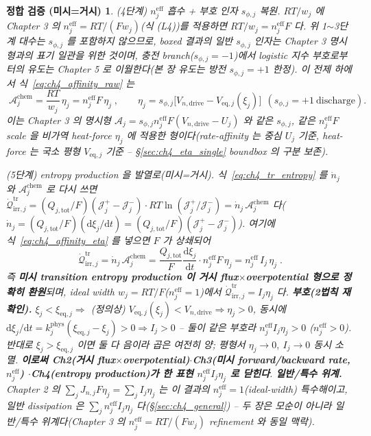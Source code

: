 \documentclass[11pt,a4paper]{article}
\newtheorem*{verifybox}{정합 검증 (미시=거시)}
\newcommand{\dd}{\mathrm{d}}
\newcommand{\eff}{\mathrm{eff}}
\newcommand{\eq}{\mathrm{eq}}
\newcommand{\drive}{\mathrm{drive}}
\newcommand{\tot}{\mathrm{tot}}
\newcommand{\irr}{\mathrm{irr}}
\newcommand{\tr}{\mathrm{tr}}
\newcommand{\chem}{\mathrm{chem}}
\begin{document}
\begin{verifybox}
\emph{(4단계) $n_j^{\eff}$ 흡수 + 부호 인자 $s_{\phi,j}$ 복원.} $RT/w_j$ 에 Chapter 3 의
$n_j^{\eff}=RT/(Fw_j)$(식 (L4))를 적용하면 $RT/w_j=n_j^{\eff}F$ 다. \emph{위 1$\sim$3단계 대수는 $s_{\phi,j}$ 를
포함하지 않으므로}, boxed 결과의 일반 $s_{\phi,j}$ 인자는 Chapter 3 명시형과의 \emph{표기 일관}을 위한 것이며,
충전 branch($s_{\phi,j}=-1$)에서 logistic 지수 부호로부터의 \emph{유도}는 Chapter 5 로 이월한다(본 장 유도는 방전
$s_{\phi,j}=+1$ 한정). 이 전제 하에서 식~\eqref{eq:ch4_affinity_raw} 는
\begin{equation}
\boxed{\;\mathcal A_j^{\chem}=\frac{RT}{w_j}\,\eta_j=n_j^{\eff}F\,\eta_j\;,\qquad
\eta_j=s_{\phi,j}\big[V_{n,\drive}-V_{\eq,j}(\xi_j)\big]\ \ (s_{\phi,j}=+1\ \text{discharge}).}
\label{eq:ch4_affinity_eta}
\end{equation}
이는 Chapter 3 의 명시형 $\mathcal A_j=s_{\phi,j}n_j^{\eff}F(V_{n,\drive}-U_j)$ 와 \emph{같은 $s_{\phi,j}$,
같은 $n_j^{\eff}F$ scale} 을 비가역 \emph{heat-force} $\eta_j$ 에 적용한 형이다(rate-affinity 는 중심 $U_j$
기준, heat-force 는 국소 평형 $V_{\eq,j}$ 기준 -- \S\ref{sec:ch4_eta_single} boundbox 의 구분 보존).

\emph{(5단계) entropy production 을 발열로(미시=거시).} 식~\eqref{eq:ch4_tr_entropy} 를 $\dot n_j$ 와
$\mathcal A_j^{\chem}$ 로 다시 쓰면 $\dot{\mathcal Q}_{\irr,j}^{\tr}=(Q_{j,\tot}/F)(\mathcal J_j^+-\mathcal J_j^-)
\cdot RT\ln(\mathcal J_j^+/\mathcal J_j^-)=\dot n_j\,\mathcal A_j^{\chem}$ 다($\dot n_j=(Q_{j,\tot}/F)(\dd\xi_j/\dd t)
=(Q_{j,\tot}/F)(\mathcal J_j^+-\mathcal J_j^-)$). 여기에 식~\eqref{eq:ch4_affinity_eta} 를 넣으면 $F$ 가 상쇄되어
\begin{equation}
\boxed{\;\dot{\mathcal Q}_{\irr,j}^{\tr}=\dot n_j\,\mathcal A_j^{\chem}
=\frac{Q_{j,\tot}}{F}\frac{\dd\xi_j}{\dd t}\cdot n_j^{\eff}F\,\eta_j
=n_j^{\eff}\,I_j\,\eta_j\;.}
\label{eq:ch4_micro_macro}
\end{equation}
즉 \textbf{미시 transition entropy production 이 거시 flux$\times$overpotential 형으로 정확히 환원}되며, ideal
width $w_j=RT/F$($n_j^{\eff}=1$)에서 $\dot{\mathcal Q}_{\irr,j}^{\tr}=I_j\eta_j$ 다. \textbf{부호(2법칙
재확인).} $\xi_j<\xi_{\eq,j}\Rightarrow$ (정의상) $V_{\eq,j}(\xi_j)<V_{n,\drive}\Rightarrow\eta_j>0$, 동시에
$\dd\xi_j/\dd t=k_j^{\mathrm{phys}}(\xi_{\eq,j}-\xi_j)>0\Rightarrow I_j>0$ -- 둘이 같은 부호라 $n_j^{\eff}I_j\eta_j>0$
($n_j^{\eff}>0$). 반대로 $\xi_j>\xi_{\eq,j}$ 이면 둘 다 음이라 곱은 여전히 양; 평형서 $\eta_j\to0,\ I_j\to0$
동시 소멸. \textbf{이로써 Ch2(거시 flux$\times$overpotential)$\cdot$Ch3(미시 forward/backward rate, $n_j^{\eff}$)
$\cdot$Ch4(entropy production)가 한 표현 $n_j^{\eff}I_j\eta_j$ 로 닫힌다}.
\textbf{일반/특수 위계.} \emph{Chapter 2 의 $\sum_j J_{n,j}F\eta_j=\sum_j I_j\eta_j$ 는 이 결과의
$n_j^{\eff}=1$(ideal-width) 특수해}이고, 일반 dissipation 은 $\sum_j n_j^{\eff}I_j\eta_j$ 다(\S\ref{sec:ch4_general})
-- 두 장은 모순이 아니라 일반/특수 위계다(Chapter 3 의 $n_j^{\eff}=RT/(Fw_j)$ refinement 와 동일 맥락).
\end{verifybox}
\end{document}

